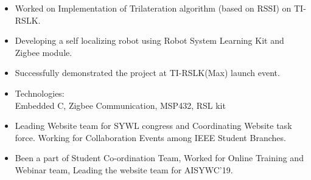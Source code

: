 \documentclass[10pt,a4paper,ragged2e,normalphoto]{altacv}
\begin{document}

\begin{itemize}
\item Worked on Implementation of Trilateration algorithm (based on RSSI) on TI-RSLK.
\smallskip
\item Developing a self localizing robot using Robot System Learning Kit and Zigbee module.
\item Successfully demonstrated the project at TI-RSLK(Max) launch event.
\item Technologies: \\ Embedded C, Zigbee Communication, MSP432,  RSL kit
\end{itemize}





\begin{itemize}
\item Leading Website team for SYWL congress and Coordinating Website task force. Working for Collaboration Events among IEEE Student Branches.
\end{itemize}

\divider

\begin{itemize}
\item Been a part of Student Co-ordination Team, Worked for Online Training and Webinar team, Leading the website team for AISYWC'19.
\end{itemize}

\divider
\end{document}
